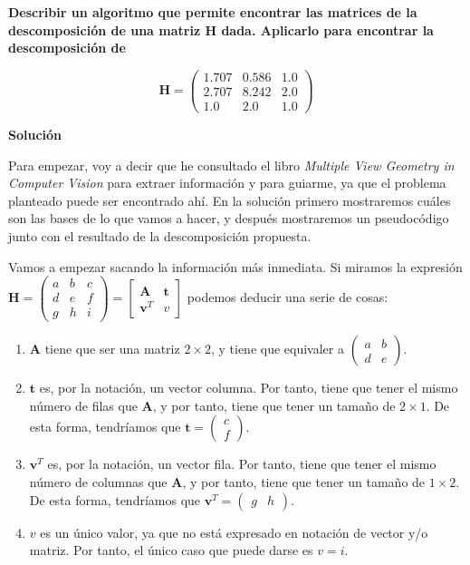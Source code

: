 \documentclass[11pt,a4paper]{article}
\newcommand{\answer}{\noindent\textbf{Solución}}
\newcommand{\question}[1]{\noindent\textbf{#1}}
\begin{document}
\question{Describir un algoritmo que permite encontrar las matrices de la
descomposición de una matriz $\mathbf{H}$ dada. Aplicarlo para encontrar la
descomposición de}

$$
	\mathbf{H} = \begin{pmatrix}
	1.707 & 0.586 & 1.0 \\
	2.707 & 8.242 & 2.0 \\
	1.0 & 2.0 & 1.0
	\end{pmatrix}
$$

\answer

Para empezar, voy a decir que he consultado el libro
\textit{Multiple View Geometry in Computer Vision}\cite{Hartley:2003:MVG:861369}
para extraer información y para guiarme, ya que el problema
planteado puede ser encontrado ahí. En la solución primero
mostraremos cuáles son las bases de lo que vamos a hacer, y después
mostraremos un pseudocódigo junto con el resultado de la descomposición
propuesta.

Vamos a empezar sacando la información más inmediata. Si miramos la expresión
$\mathbf{H}=\begin{pmatrix}a & b & c \\ d & e & f \\
g & h & i \end{pmatrix} = \begin{bmatrix} \mathbf{A} & \mathbf{t} \\ \mathbf{v}^T & v
\end{bmatrix}$ podemos deducir una serie de cosas:

\begin{enumerate}
	\item $\mathbf{A}$ tiene que ser una matriz $2\times2$, y tiene que
	equivaler a $\begin{pmatrix}a & b \\ d & e \end{pmatrix}$.
	\item $\mathbf{t}$ es, por la notación, un vector columna. Por tanto,
	tiene que tener el mismo número de filas que $\mathbf{A}$, y por tanto,
	tiene que tener un tamaño de $2 \times 1$. De esta forma, tendríamos
	que $\mathbf{t} = \begin{pmatrix} c \\ f \end{pmatrix}$.
	\item $\mathbf{v}^T$ es, por la notación, un vector fila. Por tanto,
	tiene que tener el mismo número de columnas que $\mathbf{A}$, y por tanto,
	tiene que tener un tamaño de $1 \times 2$. De esta forma, tendríamos
	que $\mathbf{v}^T = \begin{pmatrix} g & h \end{pmatrix}$.
	\item $v$ es un único valor, ya que no está expresado en notación de vector
	y/o matriz. Por tanto, el único caso que puede darse es $v = i$.
\end{enumerate}
\end{document}
